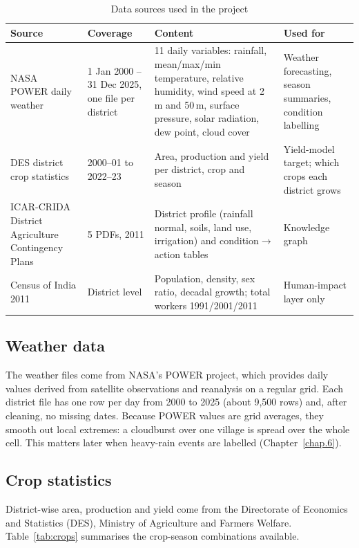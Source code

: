 \begin{table}[H]
	\centering
	\caption{Data sources used in the project}
	\label{tab:sources}
	\small
	\begin{tabularx}{\textwidth}{p{3.2cm}p{3.3cm}YY}
		\toprule
		\textbf{Source} & \textbf{Coverage} & \textbf{Content} & \textbf{Used for} \\
		\midrule
		NASA POWER \cite{nasapower} daily weather & 1 Jan 2000 -- 31 Dec 2025, one file per district & 11 daily variables: rainfall, mean/max/min temperature, relative humidity, wind speed at 2\,m and 50\,m, surface pressure, solar radiation, dew point, cloud cover & Weather forecasting, season summaries, condition labelling \\
		DES district crop statistics \cite{desagri} & 2000--01 to 2022--23 & Area, production and yield per district, crop and season & Yield-model target; which crops each district grows \\
		ICAR-CRIDA District Agriculture Contingency Plans \cite{crida2011plans} & 5 PDFs, 2011 & District profile (rainfall normal, soils, land use, irrigation) and condition$\to$action tables & Knowledge graph \\
		Census of India 2011 \cite{census2011} & District level & Population, density, sex ratio, decadal growth; total workers 1991/2001/2011 & Human-impact layer only \\
		\bottomrule
	\end{tabularx}
\end{table}

\subsection{Weather data}
The weather files come from NASA's POWER project, which provides daily values derived from satellite observations and reanalysis on a regular grid. Each district file has one row per day from 2000 to 2025 (about 9,500 rows) and, after cleaning, no missing dates. Because POWER values are grid averages, they smooth out local extremes: a cloudburst over one village is spread over the whole cell. This matters later when heavy-rain events are labelled (Chapter~\ref{chap.6}).

\subsection{Crop statistics}
District-wise area, production and yield come from the Directorate of Economics and Statistics (DES), Ministry of Agriculture and Farmers Welfare. Table~\ref{tab:crops} summarises the crop-season combinations available.

